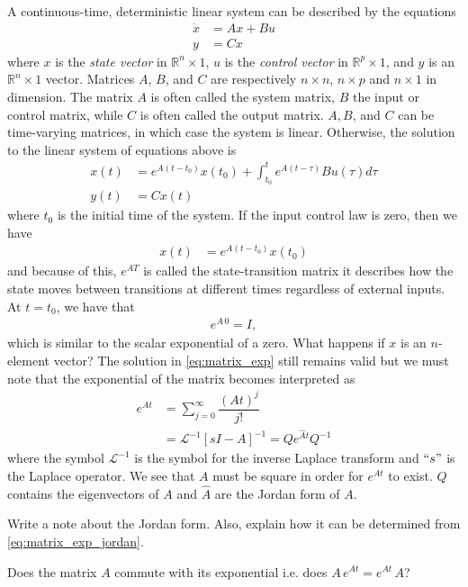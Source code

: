 A continuous-time, deterministic linear system can be described by the equations 
%
\begin{align}
	\dot{x} &= Ax + Bu \nonumber \\
	y &= Cx
\end{align}
%
where $x$ is the \textit{state vector} in $\mathbb{R}^n \times 1$, $u$ is the \textit{control vector} in $\mathbb{R}^p \times 1$, and $y$ is an  $\mathbb{R}^n \times 1$ vector. Matrices $A$, $B$, and $C$ are respectively $n\times n$, $n \times p$ and $n \times 1$ in dimension. The matrix $A$ is often called the system matrix, $B$ the input or control matrix, while $C$ is often called the output matrix. $A, B$, and $C$ can be time-varying matrices, in which case the system is linear. Otherwise, the solution to the linear system of equations above is 
%
\begin{align}
	x(t) &= e^{A(t-t_0)} x(t_0) + \int_{t_0}^{t} e^{A(t-\tau)} B u(\tau) d\tau  \\
	y(t) &= C x(t)
	\label{eq:matrix_exp}
\end{align}
%
where $t_0$ is the initial time of the system. If the input control law is zero, then we have 
%
\begin{align}
	x(t) &= e^{A(t-t_0)} x(t_0) 
\end{align}
%
and because of this, $e^{AT}$ is called the state-transition matrix \ie it describes how the state moves between transitions at different times regardless of external inputs. At $t = t_0$, we have that 
%
\begin{align}
	e^{A \, 0} = I,
\end{align}
%
which is similar to the scalar exponential of a zero. What happens if $x$ is an $n$-element vector? The solution in \eqref{eq:matrix_exp} still remains valid but we must note that the exponential of the matrix becomes interpreted as 
%
\begin{align}
	e^{At} &= \sum_{j=0}^{\infty} \dfrac{(At)^j}{j!} \nonumber \\
	&= \mathcal{L}^{-1} \left[sI - A\right]^{-1} = Q e^{\hat{A}t} Q^{-1}
	\label{eq:matrix_exp_jordan}
\end{align}
%
where the symbol $\mathcal{L}^{-1}$ is the symbol for the inverse Laplace transform and $``s"$ is the Laplace operator. We see that $A$ must be square in order for $e^{At}$ to exist. $Q$ contains the eigenvectors of $A$ and $\hat{A}$ are the Jordan form of $A$.
%
\begin{quiz}
	Write a note about the Jordan form. Also, explain how it can be determined from \eqref{eq:matrix_exp_jordan}.
\end{quiz}
%
\begin{quiz}
	Does the matrix $A$ commute with its exponential i.e. does $A \, e^{At} = e^{At} \, A$? 
\end{quiz}

